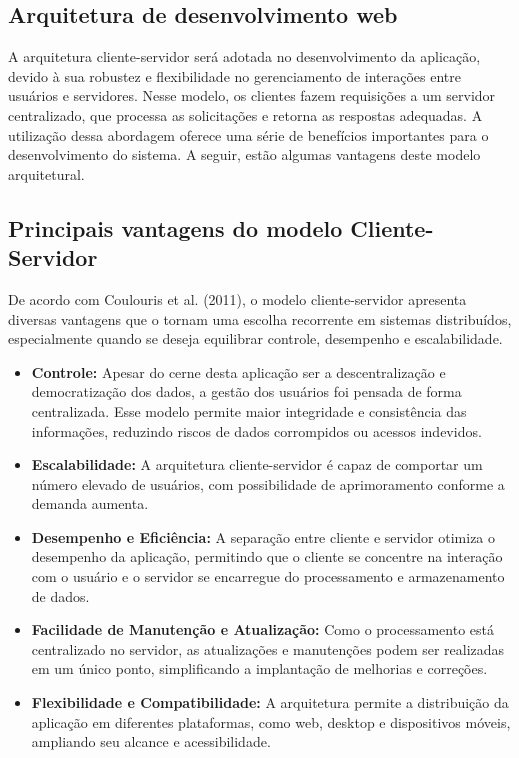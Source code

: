 \subsection{Arquitetura de desenvolvimento web}

A arquitetura cliente-servidor será adotada no desenvolvimento da aplicação, devido à sua robustez e flexibilidade no gerenciamento de interações entre usuários e servidores. Nesse modelo, os clientes fazem requisições a um servidor centralizado, que processa as solicitações e retorna as respostas adequadas. A utilização dessa abordagem oferece uma série de benefícios importantes para o desenvolvimento do sistema. A seguir, estão algumas vantagens deste modelo arquitetural.

\subsection{Principais vantagens do modelo Cliente-Servidor}

De acordo com Coulouris et al. (2011)\cite{coulouris2011}, o modelo cliente-servidor apresenta diversas vantagens que o tornam uma escolha recorrente em sistemas distribuídos, especialmente quando se deseja equilibrar controle, desempenho e escalabilidade.

\begin{itemize}
    \item \textbf{Controle:} Apesar do cerne desta aplicação ser a descentralização e democratização dos dados, a gestão dos usuários foi pensada de forma centralizada. Esse modelo permite maior integridade e consistência das informações, reduzindo riscos de dados corrompidos ou acessos indevidos.
    
    \item \textbf{Escalabilidade:} A arquitetura cliente-servidor é capaz de comportar um número elevado de usuários, com possibilidade de aprimoramento conforme a demanda aumenta.
    
    \item \textbf{Desempenho e Eficiência:} A separação entre cliente e servidor otimiza o desempenho da aplicação, permitindo que o cliente se concentre na interação com o usuário e o servidor se encarregue do processamento e armazenamento de dados.
    
    \item \textbf{Facilidade de Manutenção e Atualização:} Como o processamento está centralizado no servidor, as atualizações e manutenções podem ser realizadas em um único ponto, simplificando a implantação de melhorias e correções.
    
    \item \textbf{Flexibilidade e Compatibilidade:} A arquitetura permite a distribuição da aplicação em diferentes plataformas, como web, desktop e dispositivos móveis, ampliando seu alcance e acessibilidade.
\end{itemize}

